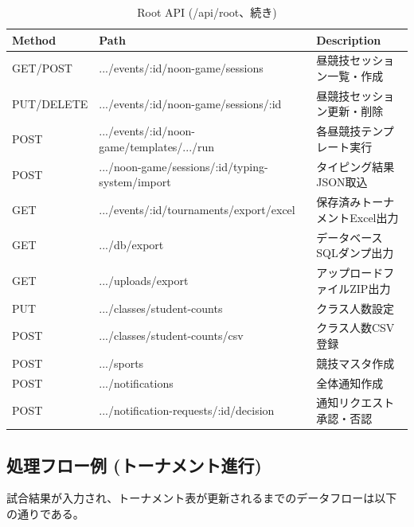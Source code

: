 \documentclass[paper=a4, fontsize=11pt]{jlreq}
\begin{document}
\begin{table}[H]
    \centering
    \caption{Root API (/api/root、続き)}
    \begin{tabularx}{\textwidth}{|p{3.1cm}|X|p{4.3cm}|}
        \toprule
        Method & Path & Description \\
        \midrule
        GET/POST & .../events/:id/noon-game/sessions & 昼競技セッション一覧・作成 \\
        PUT/DELETE & .../events/:id/noon-game/sessions/:id & 昼競技セッション更新・削除 \\
        POST & .../events/:id/noon-game/templates/.../run & 各昼競技テンプレート実行 \\
        POST & .../noon-game/sessions/:id/typing-system/import & タイピング結果JSON取込 \\
        GET & .../events/:id/tournaments/export/excel & 保存済みトーナメントExcel出力 \\
        GET & .../db/export & データベースSQLダンプ出力 \\
        GET & .../uploads/export & アップロードファイルZIP出力 \\
        PUT & .../classes/student-counts & クラス人数設定 \\
        POST & .../classes/student-counts/csv & クラス人数CSV登録 \\
        POST & .../sports & 競技マスタ作成 \\
        POST & .../notifications & 全体通知作成 \\
        POST & .../notification-requests/:id/decision & 通知リクエスト承認・否認 \\
        \bottomrule
    \end{tabularx}
\end{table}

\subsection{処理フロー例 (トーナメント進行)}
試合結果が入力され、トーナメント表が更新されるまでのデータフローは以下の通りである。
\end{document}
